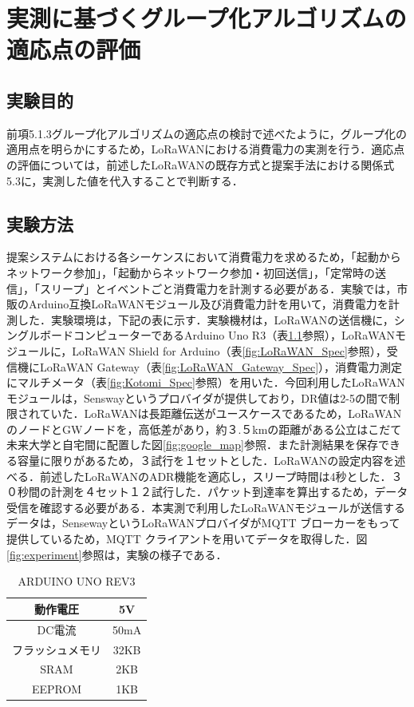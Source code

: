 \chapter{実測に基づくグループ化アルゴリズムの適応点の評価}

\section{実験目的}
前項5.1.3グループ化アルゴリズムの適応点の検討で述べたように，グループ化の適用点を明らかにするため，LoRaWANにおける消費電力の実測を行う．適応点の評価については，前述したLoRaWANの既存方式と提案手法における関係式5.3に，実測した値を代入することで判断する．

\section{実験方法}
提案システムにおける各シーケンスにおいて消費電力を求めるため，「起動からネットワーク参加」，「起動からネットワーク参加・初回送信」，「定常時の送信」，「スリープ」とイベントごと消費電力を計測する必要がある．実験では，市販のArduino互換LoRaWANモジュール及び消費電力計を用いて，消費電力を計測した．実験環境は，下記の表に示す．実験機材は，LoRaWANの送信機に，シングルボードコンピューターであるArduino Uno R3（表\ref{fig:Arduino_Spec}参照），LoRaWANモジュールに，LoRaWAN Shield for Arduino\cite{lorashield}（表\ref{fig:LoRaWAN_Spec}参照），受信機にLoRaWAN Gateway\cite{loragateway}（表\ref{fig:LoRaWAN_Gateway_Spec}），消費電力測定にマルチメータ\cite{kotomi}（表\ref{fig:Kotomi_Spec}参照）を用いた．今回利用したLoRaWANモジュールは，Senswayというプロバイダが提供しており，DR値は2-5の間で制限されていた\cite{lorawanshielduse}．LoRaWANは長距離伝送がユースケースであるため，LoRaWANのノードとGWノードを，高低差があり，約３.５kmの距離がある公立はこだて未来大学と自宅間に配置した図\ref{fig:google_map}参照．また計測結果を保存できる容量に限りがあるため，３試行を１セットとした．LoRaWANの設定内容を述べる．前述したLoRaWANのADR機能を適応し，スリープ時間は4秒とした．３０秒間の計測を４セット１２試行した．パケット到達率を算出するため，データ受信を確認する必要がある．本実測で利用したLoRaWANモジュールが送信するデータは，SensewayというLoRaWANプロバイダがMQTT ブローカーをもって提供しているため，MQTT クライアント\cite{mqtttool}を用いてデータを取得した．図\ref{fig:experiment}参照は，実験の様子である．

\begin{table}[]
    \caption{ARDUINO UNO REV3}\label{fig:Arduino_Spec}
    \centering
    \begin{tabular}{|c|c|}
    \hline
    動作電圧     & 5V   \\ \hline
    DC電流     & 50mA \\ \hline
    フラッシュメモリ & 32KB \\ \hline
    SRAM     & 2KB  \\ \hline
    EEPROM   & 1KB  \\ \hline
    \end{tabular}
\end{table}

